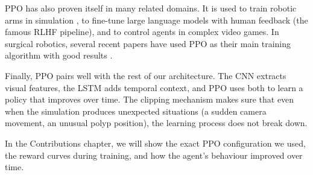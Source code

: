 PPO has also proven itself in many related domains. It is used to train robotic arms in simulation \cite{schulman2017ppo}, to fine-tune large language models with human feedback (the famous RLHF pipeline), and to control agents in complex video games. In surgical robotics, several recent papers have used PPO as their main training algorithm with good results \cite{qian2023arxiv,pore2022iros}.

Finally, PPO pairs well with the rest of our architecture. The CNN extracts visual features, the LSTM adds temporal context, and PPO uses both to learn a policy that improves over time. The clipping mechanism makes sure that even when the simulation produces unexpected situations (a sudden camera movement, an unusual polyp position), the learning process does not break down.

In the Contributions chapter, we will show the exact PPO configuration we used, the reward curves during training, and how the agent's behaviour improved over time.

